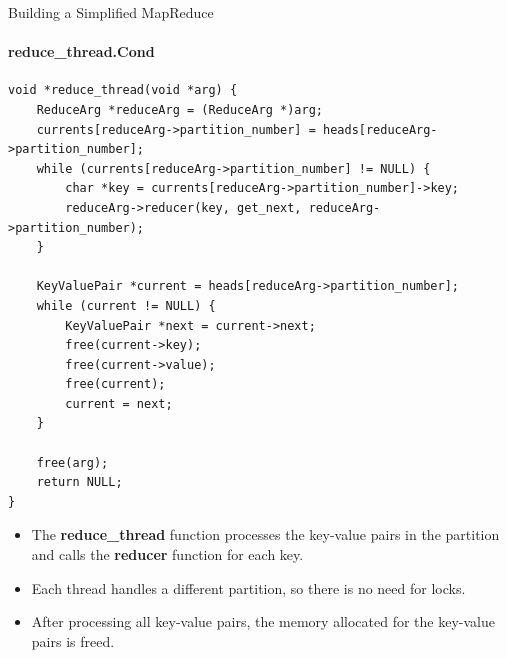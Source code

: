\documentclass[10pt]{beamer}
\begin{document}
\begin{frame}[fragile]{Building a Simplified MapReduce}
    \framesubtitle{reduce\_thread.Cond}
    \begin{minipage}{.50\linewidth}
        \begin{lstlisting}
void *reduce_thread(void *arg) {
    ReduceArg *reduceArg = (ReduceArg *)arg;
    currents[reduceArg->partition_number] = heads[reduceArg->partition_number];
    while (currents[reduceArg->partition_number] != NULL) {
        char *key = currents[reduceArg->partition_number]->key;
        reduceArg->reducer(key, get_next, reduceArg->partition_number);
    }

    KeyValuePair *current = heads[reduceArg->partition_number];
    while (current != NULL) {
        KeyValuePair *next = current->next;
        free(current->key);
        free(current->value);
        free(current);
        current = next;
    }

    free(arg);
    return NULL;
}
                      \end{lstlisting}
    \end{minipage}
    \hspace{13pt}
    \begin{minipage}{.45\linewidth}
        \begin{itemize}
            \item The \textbf{reduce\_thread} function processes the key-value pairs in the partition and calls the \textbf{reducer} function for each key.
            \item Each thread handles a different partition, so there is no need for locks.
            \item After processing all key-value pairs, the memory allocated for the key-value pairs is freed.
        \end{itemize}
    \end{minipage}
\end{frame}
\end{document}
